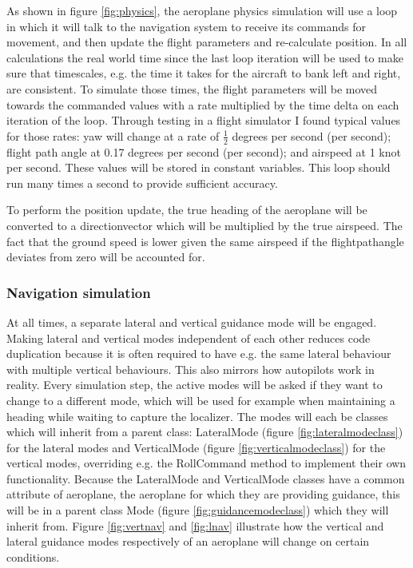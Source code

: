 \documentclass{article}
\begin{document}
As shown in figure \ref{fig:physics}, the aeroplane physics simulation will use a loop in which it will talk to the navigation system to receive its commands for movement, and then update the flight parameters and re-calculate position.
In all calculations the real world time since the last loop iteration will be used to make sure that timescales, e.g. the time it takes for the aircraft to bank left and right, are consistent.
To simulate those times, the flight parameters will be moved towards the commanded values with a rate multiplied by the time delta on each iteration of the loop.
Through testing in a flight simulator I found typical values for those rates: yaw will change at a rate of $\frac{1}{2}$ degrees per second (per second); flight path angle at 0.17 degrees per second (per second); and airspeed at 1 knot per second.
These values will be stored in constant variables.
This loop should run many times a second to provide sufficient accuracy.

To perform the position update, the true heading of the aeroplane will be converted to a \gls{directionvector} which will be multiplied by the true airspeed.
The fact that the ground speed is lower given the same airspeed if the \gls{flightpathangle} deviates from zero will be accounted for.

\subsubsection{Navigation simulation}
At all times, a separate lateral and vertical guidance mode will be engaged.
Making lateral and vertical modes independent of each other reduces code duplication because it is often required to have e.g. the same lateral behaviour with multiple vertical behaviours.
This also mirrors how autopilots work in reality.
Every simulation step, the active modes will be asked if they want to change to a different mode, which will be used for example when maintaining a heading while waiting to capture the localizer.
The modes will each be classes which will inherit from a parent class: LateralMode (figure \ref{fig:lateralmodeclass}) for the lateral modes and VerticalMode (figure \ref{fig:verticalmodeclass}) for the vertical modes, overriding e.g. the RollCommand method to implement their own functionality.
Because the LateralMode and VerticalMode classes have a common attribute of aeroplane, the aeroplane for which they are providing guidance, this will be in a parent class Mode (figure \ref{fig:guidancemodeclass}) which they will inherit from.
Figure \ref{fig:vertnav} and \ref{fig:lnav} illustrate how the vertical and lateral guidance modes respectively of an aeroplane will change on certain conditions.
\end{document}
